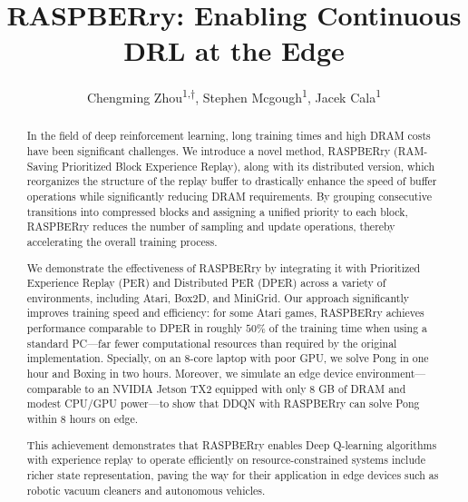 \documentclass[10pt]{article} %
\title{RASPBERry: Enabling Continuous DRL at the Edge}
\author{Chengming Zhou\textsuperscript{1,$\dagger$}, Stephen Mcgough\textsuperscript{1}, Jacek Cala\textsuperscript{1}}
\begin{document}
\makeCover  %
\maketitle  %

\begin{abstract}
In the field of deep reinforcement learning, long training times and high DRAM costs have been significant challenges.
We introduce a novel method, RASPBERry (RAM-Saving Prioritized Block Experience Replay), along with its distributed version, which reorganizes the structure of the replay buffer to drastically enhance the speed of buffer operations while significantly reducing DRAM requirements.
By grouping consecutive transitions into compressed blocks and assigning a unified priority to each block, RASPBERry reduces the number of sampling and update operations, thereby accelerating the overall training process.

We demonstrate the effectiveness of RASPBERry by integrating it with Prioritized Experience Replay (PER) and Distributed PER (DPER) across a variety of environments, including Atari, Box2D, and MiniGrid.
Our approach significantly improves training speed and efficiency: for some Atari games, RASPBERry achieves performance comparable to DPER in roughly $50\%$ of the training time when using a standard PC—far fewer computational resources than required by the original implementation.
Specially, on an 8-core laptop with poor GPU, we solve Pong in one hour and Boxing in two hours.
Moreover, we simulate an edge device environment—comparable to an NVIDIA Jetson TX2 equipped with only 8 GB of DRAM and modest CPU/GPU power—to show that DDQN with RASPBERry can solve Pong within 8 hours on edge.

This achievement demonstrates that RASPBERry enables Deep Q-learning algorithms with experience replay to operate efficiently on resource-constrained systems include richer state representation, paving the way for their application in edge devices such as robotic vacuum cleaners and autonomous vehicles.

\end{abstract}
\end{document}
